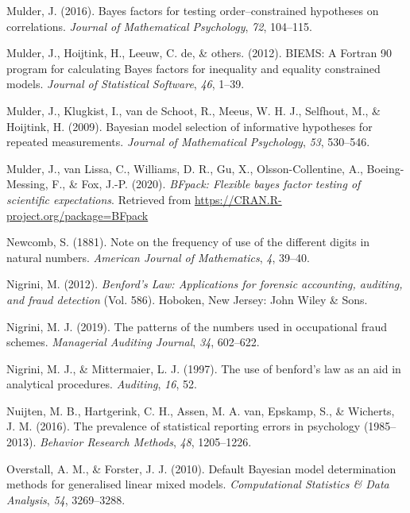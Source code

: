 \documentclass[
  english,
  man,floatsintext]{apa6}
\begin{document}
\leavevmode\hypertarget{ref-mulder2016bayes}{}%
Mulder, J. (2016). Bayes factors for testing order--constrained hypotheses on correlations. \emph{Journal of Mathematical Psychology}, \emph{72}, 104--115.

\leavevmode\hypertarget{ref-mulder2012biems}{}%
Mulder, J., Hoijtink, H., Leeuw, C. de, \& others. (2012). BIEMS: A Fortran 90 program for calculating Bayes factors for inequality and equality constrained models. \emph{Journal of Statistical Software}, \emph{46}, 1--39.

\leavevmode\hypertarget{ref-mulder2009bayesian}{}%
Mulder, J., Klugkist, I., van de Schoot, R., Meeus, W. H. J., Selfhout, M., \& Hoijtink, H. (2009). Bayesian model selection of informative hypotheses for repeated measurements. \emph{Journal of Mathematical Psychology}, \emph{53}, 530--546.

\leavevmode\hypertarget{ref-bfpack}{}%
Mulder, J., van Lissa, C., Williams, D. R., Gu, X., Olsson-Collentine, A., Boeing-Messing, F., \& Fox, J.-P. (2020). \emph{BFpack: Flexible bayes factor testing of scientific expectations}. Retrieved from \url{https://CRAN.R-project.org/package=BFpack}

\leavevmode\hypertarget{ref-newcomb1881note}{}%
Newcomb, S. (1881). Note on the frequency of use of the different digits in natural numbers. \emph{American Journal of Mathematics}, \emph{4}, 39--40.

\leavevmode\hypertarget{ref-nigrini2012benford}{}%
Nigrini, M. (2012). \emph{Benford's Law: Applications for forensic accounting, auditing, and fraud detection} (Vol. 586). Hoboken, New Jersey: John Wiley \& Sons.

\leavevmode\hypertarget{ref-nigrini2019patterns}{}%
Nigrini, M. J. (2019). The patterns of the numbers used in occupational fraud schemes. \emph{Managerial Auditing Journal}, \emph{34}, 602--622.

\leavevmode\hypertarget{ref-nigrini1997use}{}%
Nigrini, M. J., \& Mittermaier, L. J. (1997). The use of benford's law as an aid in analytical procedures. \emph{Auditing}, \emph{16}, 52.

\leavevmode\hypertarget{ref-nuijten2016prevalence}{}%
Nuijten, M. B., Hartgerink, C. H., Assen, M. A. van, Epskamp, S., \& Wicherts, J. M. (2016). The prevalence of statistical reporting errors in psychology (1985--2013). \emph{Behavior Research Methods}, \emph{48}, 1205--1226.

\leavevmode\hypertarget{ref-overstall2010default}{}%
Overstall, A. M., \& Forster, J. J. (2010). Default Bayesian model determination methods for generalised linear mixed models. \emph{Computational Statistics \& Data Analysis}, \emph{54}, 3269--3288.
\end{document}
